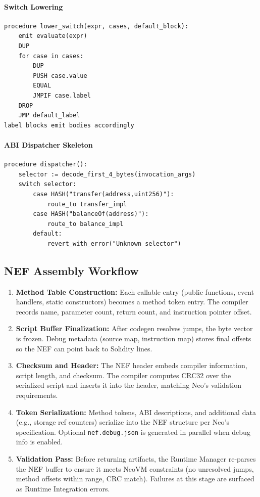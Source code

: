 \documentclass[11pt]{article}
\begin{document}
\paragraph{Switch Lowering}
\begin{verbatim}
procedure lower_switch(expr, cases, default_block):
    emit evaluate(expr)
    DUP
    for case in cases:
        DUP
        PUSH case.value
        EQUAL
        JMPIF case.label
    DROP
    JMP default_label
label blocks emit bodies accordingly
\end{verbatim}

\paragraph{ABI Dispatcher Skeleton}
\begin{verbatim}
procedure dispatcher():
    selector := decode_first_4_bytes(invocation_args)
    switch selector:
        case HASH("transfer(address,uint256)"):
            route_to transfer_impl
        case HASH("balanceOf(address)"):
            route_to balance_impl
        default:
            revert_with_error("Unknown selector")
\end{verbatim}

\subsection{NEF Assembly Workflow}
\begin{enumerate}
    \item \textbf{Method Table Construction:} Each callable entry (public functions, event handlers, static constructors) becomes a method token entry. The compiler records name, parameter count, return count, and instruction pointer offset.
    \item \textbf{Script Buffer Finalization:} After codegen resolves jumps, the byte vector is frozen. Debug metadata (source map, instruction map) stores final offsets so the NEF can point back to Solidity lines.
    \item \textbf{Checksum and Header:} The NEF header embeds compiler information, script length, and checksum. The compiler computes CRC32 over the serialized script and inserts it into the header, matching Neo's validation requirements.
    \item \textbf{Token Serialization:} Method tokens, ABI descriptions, and additional data (e.g., storage ref counters) serialize into the NEF structure per Neo's specification. Optional \texttt{nef.debug.json} is generated in parallel when debug info is enabled.
    \item \textbf{Validation Pass:} Before returning artifacts, the Runtime Manager re-parses the NEF buffer to ensure it meets NeoVM constraints (no unresolved jumps, method offsets within range, CRC match). Failures at this stage are surfaced as Runtime Integration errors.
\end{enumerate}
\end{document}
